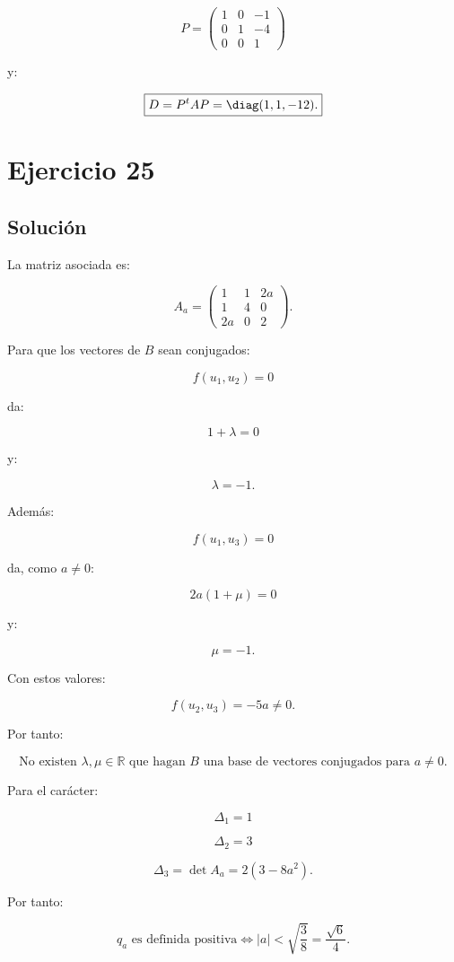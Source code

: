 \documentclass[11pt,a4paper]{article}
\newcommand{\R}{\mathbb{R}}
\begin{document}
\[
\boxed{
P=
\begin{pmatrix}
1&0&-1\\
0&1&-4\\
0&0&1
\end{pmatrix}
}
\]

y:

\[
\boxed{
D=P^tAP=\diag(1,1,-12).
}
\]

\section{Ejercicio 25}
\subsection{Solución}

La matriz asociada es:

\[
\boxed{
A_a=
\begin{pmatrix}
1&1&2a\\
1&4&0\\
2a&0&2
\end{pmatrix}.
}
\]

Para que los vectores de $B$ sean conjugados:

\[
f(u_1,u_2)=0
\]

da:

\[
1+\lambda=0
\]

y:

\[
\lambda=-1.
\]

Además:

\[
f(u_1,u_3)=0
\]

da, como $a\neq0$:

\[
2a(1+\mu)=0
\]

y:

\[
\mu=-1.
\]

Con estos valores:

\[
f(u_2,u_3)=-5a\neq0.
\]

Por tanto:

\[
\boxed{
\text{No existen }\lambda,\mu\in\R
\text{ que hagan }B\text{ una base de vectores conjugados para }a\neq0.
}
\]

Para el carácter:

\[
\Delta_1=1
\]

\[
\Delta_2=3
\]

\[
\Delta_3
=
\det A_a
=
2(3-8a^2).
\]

Por tanto:

\[
\boxed{
q_a\text{ es definida positiva}
\iff
|a|<\sqrt{\frac38}
=
\frac{\sqrt6}{4}.
}
\]
\end{document}
